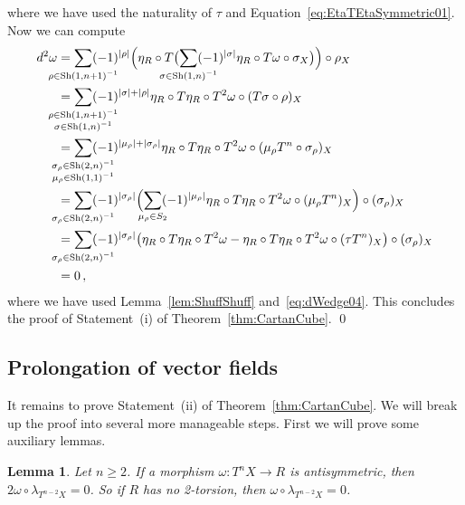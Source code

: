 \documentclass[12pt,reqno, a4paper]{amsart}
\numberwithin{equation}{section}
\theoremstyle{plain}
\newtheorem{Lemma}[Theorem]{Lemma}
\theoremstyle{definition}
\theoremstyle{remark}
\DeclareMathOperator{\Shuff}{Sh}
\newcommand{\Val}{\eta}
\begin{document}
where we have used the naturality of $\tau$ and Equation~\eqref{eq:EtaTEtaSymmetric01}. Now we can compute
\begin{equation*}
\begin{split}
  d^2 \omega
  &=
  \sum_{\mathclap{\rho \in \Shuff(1,n+1)^{-1}}}(-1)^{|\rho|}
  \Bigl( \Val_R \circ T
  \bigl( \sum_{\mathclap{\sigma \in \Shuff(1,n)^{-1}}}(-1)^{|\sigma|}
  \Val_R \circ T\omega \circ \sigma_X \bigr) \Bigr) \circ \rho_X
  \\
  &=
  \sum_{
    \mathclap{
      \substack{
        \rho \in \Shuff(1,n+1)^{-1} \\
        \sigma \in \Shuff(1,n)^{-1}
      }
    }
  }(-1)^{|\sigma|+|\rho|}
  \Val_R \circ T\Val_R \circ T^2\omega \circ (T\sigma \circ \rho)_X
  \\
  &=
  \sum_{
    \mathclap{
      \substack{
        \sigma_\rho \in \Shuff(2,n)^{-1} \\
        \mu_\rho \in \Shuff(1,1)^{-1}
      }
    }
  }
  (-1)^{|\mu_\rho|+|\sigma_\rho|}
  \Val_R \circ T\Val_R \circ T^2\omega \circ (\mu_\rho T^n \circ \sigma_\rho)_X
  \\
  &=
  \sum_{
    \mathclap{
        \sigma_\rho \in \Shuff(2,n)^{-1}
    }
  }
  (-1)^{|\sigma_\rho|}
  \Bigl(
  \sum_{
    \mathclap{
      \mu_\rho \in S_2
    }
  }
  (-1)^{|\mu_\rho|}
  \Val_R \circ T\Val_R \circ T^2\omega \circ (\mu_\rho T^n)_X
  \Bigr) \circ (\sigma_\rho)_X
  \\
  &=
  \sum_{
    \mathclap{
        \sigma_\rho \in \Shuff(2,n)^{-1}
    }
  }
  (-1)^{|\sigma_\rho|}
  \bigl(
    \Val_R \circ T\Val_R \circ T^2\omega
    - \Val_R \circ T\Val_R \circ T^2\omega \circ (\tau T^n)_X
  \bigr) \circ (\sigma_\rho)_X
  \\
  &= 0
  \,,
\end{split}
\end{equation*}
where we have used Lemma~\ref{lem:ShuffShuff} and~\eqref{eq:dWedge04}. This concludes the proof of Statement~(i) of Theorem~\ref{thm:CartanCube}. \qed



\subsection{Prolongation of vector fields}

It remains to prove Statement~(ii) of Theorem~\ref{thm:CartanCube}. We will break up the proof into several more manageable steps. First we will prove some auxiliary lemmas.

\begin{Lemma}
\label{lem:FormLambdaZero}
Let $n \geq 2$. If a morphism $\omega\colon T^n X \to R$ is antisymmetric, then $2\omega \circ \lambda_{T^{n-2}X} = 0$. So if $R$ has no 2-torsion, then $\omega \circ \lambda_{T^{n-2}X} = 0$.
\end{Lemma}
\end{document}
